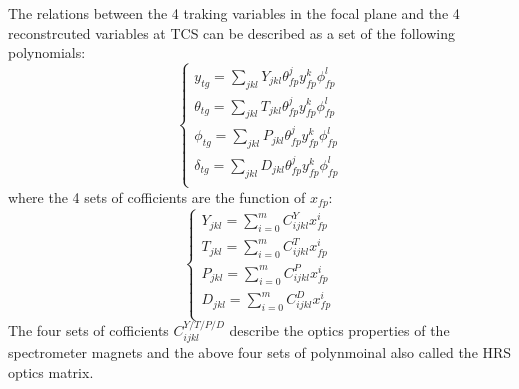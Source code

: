 The relations between the 4 traking variables in the focal plane and the 4 reconstrcuted variables at TCS can be described as a set of the following polynomials:
\begin{equation}  
\left\{  
             \begin{array}{lr}  
             y_{tg}=\sum_{jkl}Y_{jkl} \theta_{fp}^{j} y_{fp}^{k} \phi_{fp}^{l} \\  
             \theta_{tg}=\sum_{jkl}T_{jkl} \theta_{fp}^{j} y_{fp}^{k} \phi_{fp}^{l} \\    
             \phi_{tg}=\sum_{jkl}P_{jkl} \theta_{fp}^{j} y_{fp}^{k} \phi_{fp}^{l} \\     
             \delta_{tg}=\sum_{jkl}D_{jkl} \theta_{fp}^{j} y_{fp}^{k} \phi_{fp}^{l}\\  
             \end{array}  
\right.  
\label{optics_1}
\end{equation}  
where the 4 sets of cofficients are the function of $x_{fp}$:
\begin{equation}  
\left\{  
             \begin{array}{lr}  
             Y_{jkl}=\sum_{i=0}^{m} C_{ijkl}^{Y} x_{fp}^{i} \\  
             T_{jkl}=\sum_{i=0}^{m} C_{ijkl}^{T} x_{fp}^{i} \\
             P_{jkl}=\sum_{i=0}^{m} C_{ijkl}^{P} x_{fp}^{i} \\
             D_{jkl}=\sum_{i=0}^{m} C_{ijkl}^{D} x_{fp}^{i} \\ 
             \end{array}  
\right.  
\label{optics_2 }
\end{equation} 
The four sets of cofficients $C_{ijkl}^{Y/T/P/D}$ describe the optics properties of the spectrometer magnets and the above four sets of polynmoinal also called the HRS optics matrix.                                                                     
